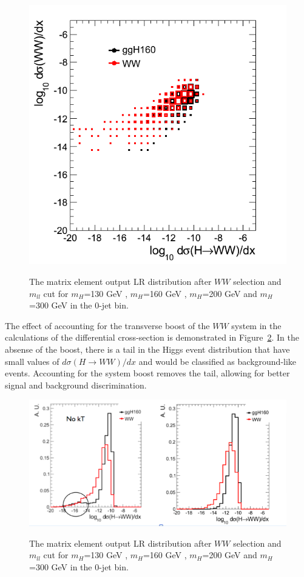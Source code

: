 \documentclass{cmspaper}
\begin{document}
\begin{figure}[!hbtp]
{\includegraphics[width=.42\textwidth]{figures/Xsec_WWvsHWW.png}}\\                                            
\caption{The matrix element output LR distribution after $WW$ selection and $m_{ll}$ cut                      
for $m_H$=130 GeV , $m_H$=160 GeV , $m_H$=200 GeV 
 and $m_H$=300 GeV  in the 0-jet bin.}                                            
\label{fig:dXsecPlots}                                                                                          
\end{figure}                      

The effect of accounting for the transverse boost of the $WW$ system in the calculations of the 
differential cross-section is demonstrated in Figure~\ref{fig:kteffect}. In the absense of the boost, there is a tail in the Higgs event distribution 
 that have small values of $d\sigma(H \rightarrow WW)/dx$ and would be classified as background-like events. Accounting for the system boost removes the tail,
allowing for better signal and background discrimination. 

\begin{figure}[!hbtp]                                                                                         
\centering                                                                                                                                             
\includegraphics[width=.84\textwidth]{figures/SystemBoostEffect.png}\\                                            
\caption{The matrix element output LR distribution after $WW$ selection and $m_{ll}$ cut                      
for $m_H$=130 GeV , $m_H$=160 GeV , $m_H$=200 GeV 
 and $m_H$=300 GeV  in the 0-jet bin.}                                            
\label{fig:kteffect}                                                                                          
\end{figure}          
\end{document}
